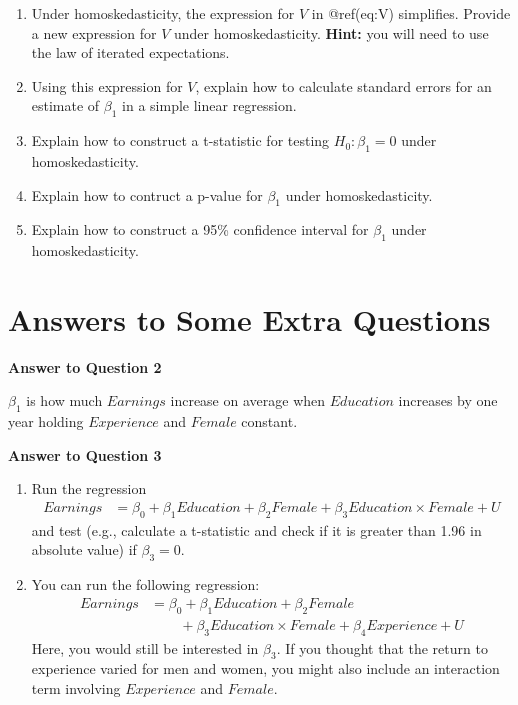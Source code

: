 \documentclass[
  letterpaper,
  DIV=11,
  numbers=noendperiod]{scrreprt}
\begin{document}
\begin{enumerate}
  \begin{enumerate}
  \def\labelenumii{\alph{enumii})}
  \item
    Under homoskedasticity, the expression for \(V\) in @ref(eq:V)
    simplifies. Provide a new expression for \(V\) under
    homoskedasticity. \textbf{Hint:} you will need to use the law of
    iterated expectations.
  \item
    Using this expression for \(V\), explain how to calculate standard
    errors for an estimate of \(\beta_1\) in a simple linear regression.
  \item
    Explain how to construct a t-statistic for testing
    \(H_0: \beta_1=0\) under homoskedasticity.
  \item
    Explain how to contruct a p-value for \(\beta_1\) under
    homoskedasticity.
  \item
    Explain how to construct a 95\% confidence interval for \(\beta_1\)
    under homoskedasticity.
  \end{enumerate}
\end{enumerate}

\section{Answers to Some Extra
Questions}\label{answers-to-some-extra-questions}

\textbf{Answer to Question 2}

\(\beta_1\) is how much \(Earnings\) increase on average when
\(Education\) increases by one year holding \(Experience\) and
\(Female\) constant.

\textbf{Answer to Question 3}

\begin{enumerate}
\def\labelenumi{\alph{enumi})}
\item
  Run the regression \begin{align*}
       Earnings &= \beta_0 + \beta_1 Education + \beta_2 Female + \beta_3 Education \times Female + U
   \end{align*} and test (e.g., calculate a t-statistic and check if it
  is greater than 1.96 in absolute value) if \(\beta_3=0\).
\item
  You can run the following regression: \begin{align*}
     Earnings &= \beta_0 + \beta_1 Education + \beta_2 Female \\
     & \hspace{25pt} + \beta_3 Education \times Female + \beta_4 Experience + U
  \end{align*} Here, you would still be interested in \(\beta_3\). If
  you thought that the return to experience varied for men and women,
  you might also include an interaction term involving \(Experience\)
  and \(Female\).
\end{enumerate}
\end{document}
